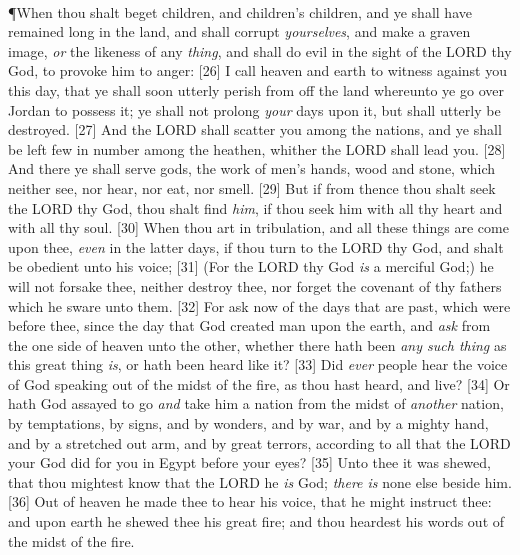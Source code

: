 \\
\P \textcolor[rgb]{0.00,0.00,1.00}{When thou shalt beget children, and children's children, and ye shall have remained long in the land, and shall corrupt \emph{yourselves}, and make a graven image, \emph{or} the likeness of any \emph{thing}, and shall do evil in the sight of the LORD thy God, to provoke him to anger:}
[26] \textcolor[rgb]{0.00,0.00,1.00}{I call heaven and earth to witness against you this day, that ye shall soon utterly perish from off the land whereunto ye go over Jordan to possess it; ye shall not prolong \emph{your} days upon it, but shall utterly be destroyed.}
[27] \textcolor[rgb]{0.00,0.00,1.00}{And the LORD shall scatter you among the nations, and ye shall be left few in number among the heathen, whither the LORD shall lead you.}
[28] \textcolor[rgb]{0.00,0.00,1.00}{And there ye shall serve gods, the work of men's hands, wood and stone, which neither see, nor hear, nor eat, nor smell.}
[29] \textcolor[rgb]{0.00,0.00,1.00}{But if from thence thou shalt seek the LORD thy God, thou shalt find \emph{him}, if thou seek him with all thy heart and with all thy soul.}
[30] \textcolor[rgb]{0.00,0.00,1.00}{When thou art in tribulation, and all these things are come upon thee, \emph{even} in the latter days, if thou turn to the LORD thy God, and shalt be obedient unto his voice;}
[31] \textcolor[rgb]{0.00,0.00,1.00}{(For the LORD thy God \emph{is} a merciful God;) he will not forsake thee, neither destroy thee, nor forget the covenant of thy fathers which he sware unto them.}
[32] \textcolor[rgb]{0.00,0.00,1.00}{For ask now of the days that are past, which were before thee, since the day that God created man upon the earth, and \emph{ask} from the one side of heaven unto the other, whether there hath been \emph{any such thing} as this great thing \emph{is}, or hath been heard like it?}
[33] \textcolor[rgb]{0.00,0.00,1.00}{Did \emph{ever} people hear the voice of God speaking out of the midst of the fire, as thou hast heard, and live?}
[34] \textcolor[rgb]{0.00,0.00,1.00}{Or hath God assayed to go \emph{and} take him a nation from the midst of \emph{another} nation, by temptations, by signs, and by wonders, and by war, and by a mighty hand, and by a stretched out arm, and by great terrors, according to all that the LORD your God did for you in Egypt before your eyes?}
[35] \textcolor[rgb]{0.00,0.00,1.00}{Unto thee it was shewed, that thou mightest know that the LORD he \emph{is} God; \emph{there is} none else beside him.}
[36] \textcolor[rgb]{0.00,0.00,1.00}{Out of heaven he made thee to hear his voice, that he might instruct thee: and upon earth he shewed thee his great fire; and thou heardest his words out of the midst of the fire.}
